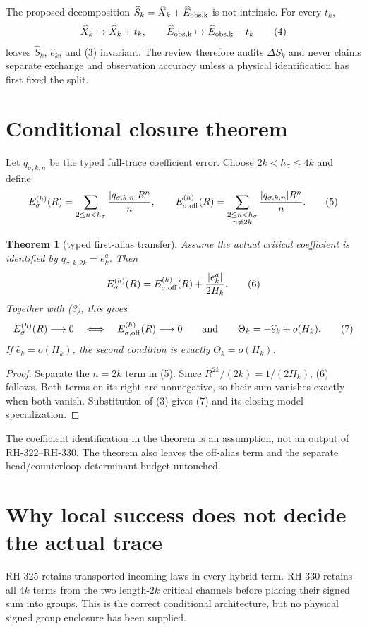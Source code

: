 \documentclass[11pt]{article}
\newtheorem{theorem}{Theorem}[section]
\theoremstyle{remark}\newtheorem{remark}[theorem]{Remark}
\newcommand{\Hk}{H_k}
\begin{document}
The proposed decomposition $\widehat S_k=\widehat X_k+\widehat E_{\rm obs,k}$
is not intrinsic.  For every $t_k$,
\[
 \widehat X_k\mapsto\widehat X_k+t_k,
 \qquad
 \widehat E_{\rm obs,k}\mapsto\widehat E_{\rm obs,k}-t_k             \tag{4}
\]
leaves $\widehat S_k$, $\widehat e_k$, and (3) invariant.  The review
therefore audits $\Delta S_k$ and never claims separate exchange and
observation accuracy unless a physical identification has first fixed the
split.

\section{Conditional closure theorem}
Let $q_{\sigma,k,n}$ be the typed full-trace coefficient error.  Choose
$2k<h_\sigma\le4k$ and define
\[
 E_\sigma^{(h)}(R)=\sum_{2\le n<h_\sigma}\frac{|q_{\sigma,k,n}|R^n}{n},
 \qquad
 E_{\sigma,\rm off}^{(h)}(R)=
 \sum_{\substack{2\le n<h_\sigma\\ n\ne2k}}
 \frac{|q_{\sigma,k,n}|R^n}{n}.                                \tag{5}
\]

\begin{theorem}[typed first-alias transfer]
Assume the actual critical coefficient is identified by
$q_{\sigma,k,2k}=e_k^a$.  Then
\[
 E_\sigma^{(h)}(R)=E_{\sigma,\rm off}^{(h)}(R)
       +\frac{|e_k^a|}{2\Hk}.                                  \tag{6}
\]
Together with (3), this gives
\[
 E_\sigma^{(h)}(R)\longrightarrow0
 \quad\Longleftrightarrow\quad
 E_{\sigma,\rm off}^{(h)}(R)\longrightarrow0
 \qquad\text{and}\qquad
 \Theta_k=-\widehat e_k+o(\Hk).                               \tag{7}
\]
If $\widehat e_k=o(\Hk)$, the second condition is exactly
$\Theta_k=o(\Hk)$.
\end{theorem}
\begin{proof}
Separate the $n=2k$ term in (5).  Since
$R^{2k}/(2k)=1/(2\Hk)$, (6) follows.  Both terms on its right are
nonnegative, so their sum vanishes exactly when both vanish.  Substitution
of (3) gives (7) and its closing-model specialization.
\end{proof}

The coefficient identification in the theorem is an assumption, not an
output of RH-322--RH-330.  The theorem also leaves the off-alias term and the
separate head/counterloop determinant budget untouched.

\section{Why local success does not decide the actual trace}
RH-325 retains transported incoming laws in every hybrid term.  RH-330
retains all $4k$ terms from the two length-$2k$ critical channels before
placing their signed sum into groups.  This is the correct conditional
architecture, but no physical signed group enclosure has been supplied.
\end{document}
